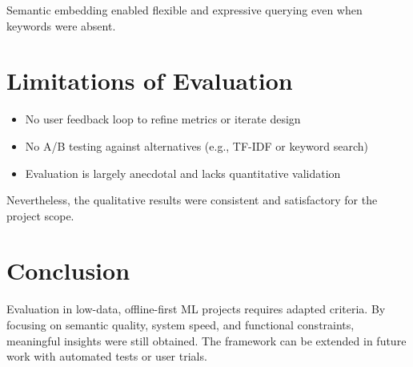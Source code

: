 Semantic embedding enabled flexible and expressive querying even when keywords were absent.

\section{Limitations of Evaluation}
\begin{itemize}
    \item No user feedback loop to refine metrics or iterate design
    \item No A/B testing against alternatives (e.g., TF-IDF or keyword search)
    \item Evaluation is largely anecdotal and lacks quantitative validation
\end{itemize}

Nevertheless, the qualitative results were consistent and satisfactory for the project scope.

\section{Conclusion}
Evaluation in low-data, offline-first ML projects requires adapted criteria. By focusing on semantic quality, system speed, and functional constraints, meaningful insights were still obtained. 
The framework can be extended in future work with automated tests or user trials.

